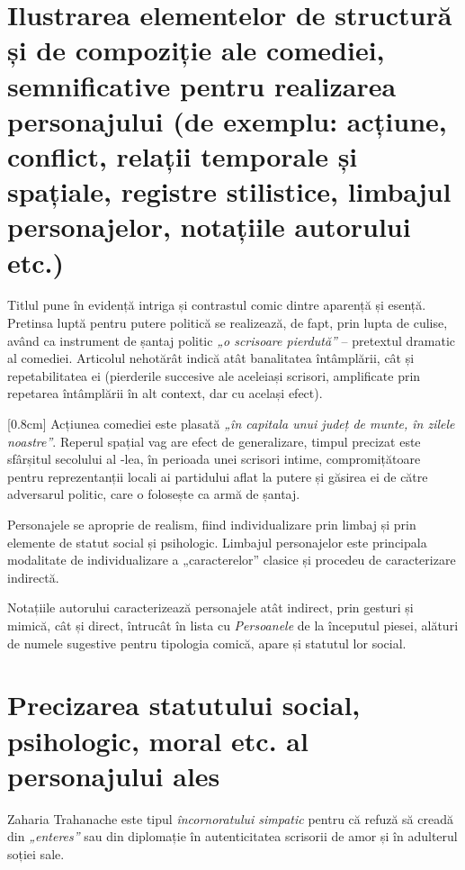 \documentclass[
12pt,                        %
a4paper                      %
]{article}
\newcommand{\rom}[1]{\uppercase\expandafter{\romannumeral #1\relax}} %
\begin{document}
\section{Ilustrarea elementelor de structură și de compoziție ale comediei, semnificative pentru realizarea personajului {\footnotesize (de exemplu: acțiune, conflict, relații temporale și spațiale, registre stilistice, limbajul personajelor, notațiile autorului etc.)}}

Titlul pune în evidență intriga și contrastul comic dintre aparență și esență. Pretinsa luptă pentru putere politică se realizează, de fapt, prin lupta de culise, având ca instrument de șantaj politic \textit{„o scrisoare pierdută”} -- pretextul dramatic al comediei. Articolul nehotărât indică atât banalitatea întâmplării, cât și repetabilitatea ei (pierderile succesive ale aceleiași scrisori, amplificate prin repetarea întâmplării în alt context, dar cu același efect).

[0.8cm]
Acțiunea comediei este plasată \textit{„în capitala unui județ de munte, în zilele noastre”}. Reperul spațial vag are efect de generalizare, timpul precizat este sfârșitul secolului al \rom{19}-lea, în perioada unei scrisori intime, compromițătoare pentru reprezentanții locali ai partidului aflat la putere și găsirea ei de către adversarul politic, care o folosește ca armă de șantaj.


Personajele se aproprie de realism, fiind individualizare prin limbaj și prin elemente de statut social și psihologic. Limbajul personajelor este principala modalitate de individualizare a „caracterelor” clasice și procedeu de caracterizare indirectă.

Notațiile autorului caracterizează personajele atât indirect, prin gesturi și mimică, cât și direct, întrucât în lista cu \textit{Persoanele} de la începutul piesei, alături de numele sugestive pentru tipologia comică, apare și statutul lor social.

\section{Precizarea statutului social, psihologic, moral etc. al personajului ales}

Zaharia Trahanache este tipul \textit{încornoratului simpatic} pentru că refuză să creadă din \textit{„enteres”} sau din diplomație în autenticitatea scrisorii de amor și în adulterul soției sale.
\end{document}
